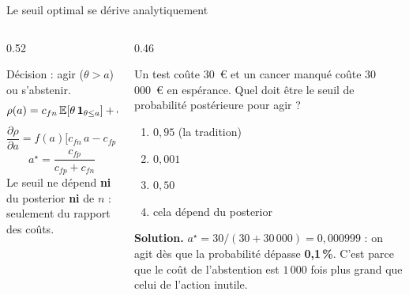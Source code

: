 \begin{frame}{Le seuil optimal se dérive analytiquement}
\begin{columns}[t]
\begin{column}{0.52\textwidth}
\begin{solbox}
Décision : agir ($\theta > a$) ou s'abstenir.
\[
\rho(a) = c_{fn}\,\mathbb{E}[\theta\,\mathbf{1}_{\theta \le a}]
        + c_{fp}\,\mathbb{E}[(1-\theta)\,\mathbf{1}_{\theta > a}]
\]
\[
\frac{\partial \rho}{\partial a}
= f(a)\Big[c_{fn}\,a - c_{fp}(1-a)\Big] = 0
\]
\[
\boxed{\;a^\star = \frac{c_{fp}}{c_{fp}+c_{fn}}\;}
\]
Le seuil ne dépend \textbf{ni} du posterior \textbf{ni} de $n$ : seulement
du rapport des coûts.
\end{solbox}
\end{column}
\begin{column}{0.46\textwidth}
\begin{qbox}
Un test coûte 30~€ et un cancer manqué coûte 30\,000~€ en espérance.
Quel doit être le seuil de probabilité postérieure pour agir ?
\vspace{2mm}
\begin{enumerate}
  \item[(A)] $0{,}95$ \quad (la tradition)
  \item[(B)] $0{,}001$ \quad \checkmark
  \item[(C)] $0{,}50$
  \item[(D)] cela dépend du posterior
\end{enumerate}
\vspace{2mm}
\textcolor{byBlue}{\textbf{Solution.}} $a^\star = 30/(30+30\,000) = 0{,}000999$ :
on agit dès que la probabilité dépasse \textbf{0,1\,\%}.
C'est parce que le coût de l'abstention est $1\,000$ fois plus grand que
celui de l'action inutile.
\end{qbox}
\end{column}
\end{columns}
\end{frame}

